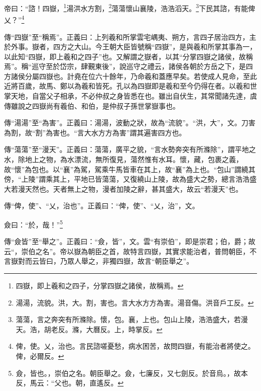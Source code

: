 帝曰：“諮！四嶽，\footnote{四嶽，即上羲和之四子，分掌四嶽之諸侯，故稱焉。}湯洪水方割，\footnote{湯湯，流貌。洪，大。割，害也。言大水方方為害。湯音傷。洪音戶工反。}蕩蕩懷山襄陵，浩浩滔天。\footnote{蕩蕩，言之奔突有所滌除。懷，包。襄，上也。包山上陵，浩浩盛大，若漫天。浩，胡老反。滌，大曆反。上，時掌反。}下民其諮，有能俾乂？”\footnote{俾，使。乂，治也。言民諮嗟憂愁，病水困苦，故問四嶽，有能治者將使之。俾，必爾反。}

{\noindent\zhuan{}\fzbyks 傳“四嶽”至“稱焉”。正義曰：上列羲和所掌雲宅嵎夷、朔方，言四子居治四方，主於外事。嶽者，四方之大山。今王朝大臣皆號稱“四嶽”，是與羲和所掌其事為一，以此知“四嶽，即上羲和之四子”也。又解謂之嶽者，以其“分掌四嶽之諸侯，故稱焉”。稱“巡守至於岱宗，肆覲東後”，說巡守之禮云，諸侯各朝於方岳之下，是四方諸侯分屬四嶽也。計堯在位六十餘年，乃命羲和蓋應早矣。若使成人見命，至此近將百歲，故馬、鄭以為羲和皆死。孔以為四嶽即是羲和至今仍得在者。以羲和世掌天地，自當父子相承，不必仲叔之身皆悉在也。雖出自伏生，其常聞諸先達，虞傳雖說之四嶽尚有羲伯、和伯，是仲叔子孫世掌嶽事也。 \par}

{\noindent\zhuan{}\fzbyks 傳“湯湯”至“為害”。正義曰：湯湯，波動之狀，故為“流貌”。“洪，大”，文。刀害為割，故“割”為害也。“言大水方方為害”謂其遍害四方也。 \par}

{\noindent\zhuan{}\fzbyks 傳“蕩蕩”至“漫天”。正義曰：蕩蕩，廣平之貌，“言水勢奔突有所滌除”，謂平地之水，除地上之物，為水漂流，無所復見，蕩然惟有水耳。懷，藏，包裹之義，故“懷”為包也。以“襄”為駕，駕乘牛馬皆車在其上，故“襄”為上也。“包山”謂繞其傍，“上陵”謂乘其上，平地已皆蕩蕩，又復繞山上陵，故為盛大之勢，總言浩浩盛大若漫天然也。天者無上之物，漫者加陵之辭，甚其盛大，故云“若漫天”也。 \par}

{\noindent\zhuan{}\fzbyks 傳“俾，使”、“乂，治也”。正義曰：“俾，使”、“乂，治”，文。 \par}

僉曰：“於，哉！”\footnote{僉，皆也。，崇伯之名。朝臣舉之。僉，七廉反，又七劍反。於音烏。，故本反，馬云：“父也。朝，直遙反。}

{\noindent\zhuan{}\fzbyks 傳“僉皆”至“舉之”。正義曰：“僉，皆”，文。雲“有崇伯”，即是崇君；伯，爵；故云“，崇伯之名”。帝以嶽為朝臣之首，故特言四嶽，其實求能治者，普問朝臣，不言嶽對而云皆曰，乃眾人舉之，非獨四嶽，故言“朝臣舉之”。 \par}


